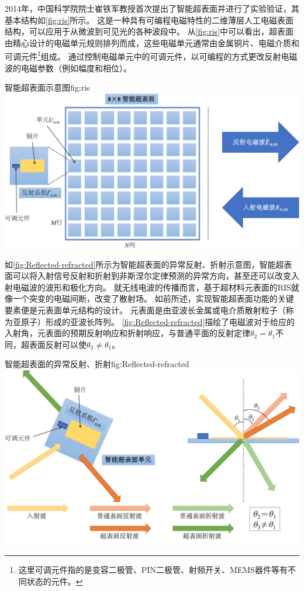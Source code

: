 \documentclass[supercite]{HustGraduPaper}
\begin{document}
2014年，中国科学院院士崔铁军教授首次提出了智能超表面并进行了实验验证，其基本结构如\autoref{fig:ris}所示\cite{cui2014coding}。
这是一种具有可编程电磁特性的二维薄层人工电磁表面结构，可以应用于从微波到可见光的各种波段中\cite{CHN_zhang2017}。
从\autoref{fig:ris}中可以看出，超表面由精心设计的电磁单元规则排列而成，这些电磁单元通常由金属铜片、电磁介质和可调元件\footnote{这里可调元件指的是变容二极管、PIN二极管、射频开关、MEMS器件等有不同状态的元件。}组成。
通过控制电磁单元中的可调元件，以可编程的方式更改反射电磁波的电磁参数（例如幅度和相位）\cite{CHN_zhou2020}。

\begin{generalfig}[htb]{智能超表面示意图}{fig:ris}
	\includegraphics[width=0.8\linewidth]{Figures/ris.pdf}
\end{generalfig}

如\autoref{fig:Reflected-refracted}所示为智能超表面的异常反射、折射示意图，智能超表面可以将入射信号反射和折射到非斯涅尔定律预测的异常方向，甚至还可以改变入射电磁波的波形和极化方向\cite{Renzo2019}。
就无线电波的传播而言，基于超材料元表面的RIS就像一个突变的电磁间断，改变了散射场。
如前所述，实现智能超表面功能的关键要素便是元表面单元结构的设计\cite{5502350, liang2019large}。
元表面是由亚波长金属或电介质散射粒子（称为亚原子）形成的亚波长阵列\cite{basar2019wireless}。
\autoref{fig:Reflected-refracted}描绘了电磁波对于给应的入射角，元表面的预期反射响应和折射响应，与普通平面的反射定律$ \theta_2 =  \theta_1 $不同，超表面反射可以使$ \theta_3 \ne \theta_1 $。

\begin{generalfig}[htb]{智能超表面的异常反射、折射}{fig:Reflected-refracted}
	\includegraphics[width=0.8\linewidth]{Figures/Reflected-refracted.pdf}
\end{generalfig}
\end{document}
